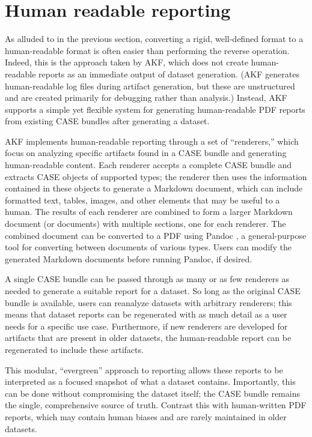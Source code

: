\section{Human readable reporting}\label{human-readable-reporting}

As alluded to in the previous section, converting a rigid, well-defined
format to a human-readable format is often easier than performing the
reverse operation. Indeed, this is the approach taken by AKF, which does
not create human-readable reports as an immediate output of dataset
generation. (AKF generates human-readable log files during artifact
generation, but these are unstructured and are created primarily for
debugging rather than analysis.) Instead, AKF supports a simple yet
flexible system for generating human-readable PDF reports from existing
CASE bundles after generating a dataset.

AKF implements human-readable reporting through a set of ``renderers,''
which focus on analyzing specific artifacts found in a CASE bundle and
generating human-readable content. Each renderer accepts a complete CASE
bundle and extracts CASE objects of supported types; the renderer then
uses the information contained in these objects to generate a Markdown
document, which can include formatted text, tables, images, and other
elements that may be useful to a human. The results of each renderer are
combined to form a larger Markdown document (or documents) with multiple
sections, one for each renderer. The combined document can be converted
to a PDF using Pandoc \cite{macfarlanePandoc2025}, a general-purpose
tool for converting between documents of various types. Users can modify
the generated Markdown documents before running Pandoc, if desired.

A single CASE bundle can be passed through as many or as few renderers
as needed to generate a suitable report for a dataset. So long as the
original CASE bundle is available, users can reanalyze datasets with
arbitrary renderers; this means that dataset reports can be regenerated
with as much detail as a user needs for a specific use case.
Furthermore, if new renderers are developed for artifacts that are
present in older datasets, the human-readable report can be regenerated
to include these artifacts.

This modular, ``evergreen'' approach to reporting allows these reports
to be interpreted as a focused snapshot of what a dataset contains.
Importantly, this can be done without compromising the dataset itself;
the CASE bundle remains the single, comprehensive source of truth.
Contrast this with human-written PDF reports, which may contain human
biases and are rarely maintained in older datasets.

